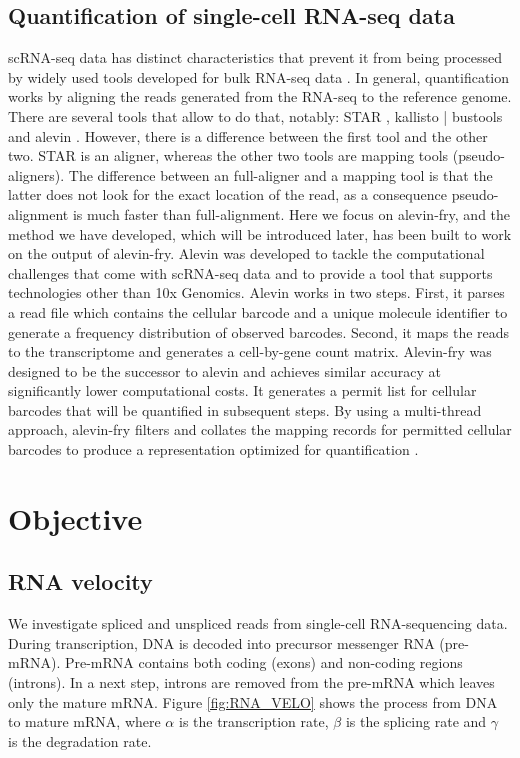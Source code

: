 \subsection{Quantification of single-cell RNA-seq data}
scRNA-seq data has distinct characteristics that prevent it from being processed by widely used tools developed for bulk RNA-seq data \citep{alevin_fry}. In general, quantification works by aligning the reads generated from the RNA-seq to the reference genome. There are several tools that allow to do that, notably: STAR \citep{star}, kallisto | bustools \citep{kallisto} and alevin \citep{alevin}. However, there is a difference between the first tool and the other two. STAR is an aligner, whereas the other two tools are mapping tools (pseudo-aligners). The difference between an full-aligner and a mapping tool is that the latter does not look for the exact location of the read, as a consequence pseudo-alignment is much faster than full-alignment. Here we focus on alevin-fry, and the method we have developed, which will be introduced later, has been built to work on the output of alevin-fry. Alevin was developed to tackle the computational challenges that come with scRNA-seq data and to provide a tool that supports technologies other than 10x Genomics. Alevin works in two steps. First, it parses a read file which contains the cellular barcode and a unique molecule identifier to generate a frequency distribution of observed barcodes. Second, it maps the reads to the transcriptome and generates a cell-by-gene count matrix. Alevin-fry \citep{alevin_fry} was designed to be the successor to alevin and achieves similar accuracy at significantly lower computational costs. It generates a permit list for cellular barcodes that will be quantified in subsequent steps. By using a multi-thread approach, alevin-fry filters and collates the mapping records for permitted cellular barcodes to produce a representation optimized for quantification \citep{alevin_fry}.

\section{Objective}

\subsection{RNA velocity}
We investigate spliced and unspliced reads from single-cell RNA-sequencing data. During transcription, DNA is decoded into precursor messenger RNA (pre-mRNA). Pre-mRNA contains both coding (exons) and non-coding regions (introns). In a next step, introns are removed from the pre-mRNA which leaves only the mature mRNA. Figure \ref{fig:RNA_VELO} shows the process from DNA to mature mRNA, where $\alpha$ is the transcription rate, $\beta$ is the splicing rate and $\gamma$ is the degradation rate.

